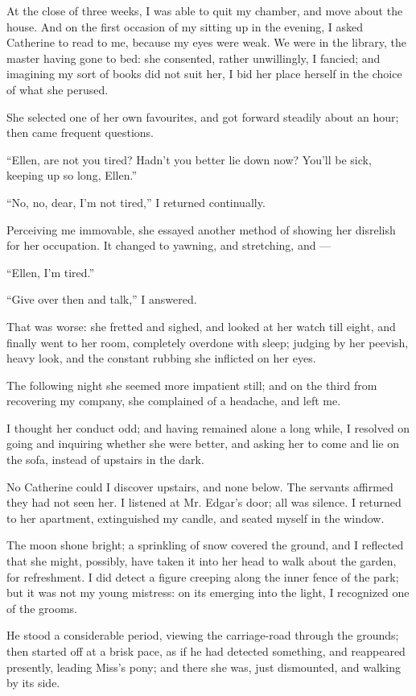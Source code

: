 \par At the close of three weeks, I was able to quit my chamber, and move about the house. And on the first occasion of my sitting up in the evening, I asked Catherine to read to me, because my eyes were weak. We were in the library, the master having gone to bed: she consented, rather unwillingly, I fancied; and imagining my sort of books did not suit her, I bid her place herself in the choice of what she perused.
\par She selected one of her own favourites, and got forward steadily about an hour; then came frequent questions.
\par “Ellen, are not you tired? Hadn't you better lie down now? You'll be sick, keeping up so long, Ellen.”
\par “No, no, dear, I'm not tired,” I returned continually.
\par Perceiving me immovable, she essayed another method of showing her disrelish for her occupation. It changed to yawning, and stretching, and —
\par “Ellen, I'm tired.”
\par “Give over then and talk,” I answered.
\par That was worse: she fretted and sighed, and looked at her watch till eight, and finally went to her room, completely overdone with sleep; judging by her peevish, heavy look, and the constant rubbing she inflicted on her eyes.
\par The following night she seemed more impatient still; and on the third from recovering my company, she complained of a headache, and left me.
\par I thought her conduct odd; and having remained alone a long while, I resolved on going and inquiring whether she were better, and asking her to come and lie on the sofa, instead of upstairs in the dark.
\par No Catherine could I discover upstairs, and none below. The servants affirmed they had not seen her. I listened at Mr. Edgar's door; all was silence. I returned to her apartment, extinguished my candle, and seated myself in the window.
\par The moon shone bright; a sprinkling of snow covered the ground, and I reflected that she might, possibly, have taken it into her head to walk about the garden, for refreshment. I did detect a figure creeping along the inner fence of the park; but it was not my young mistress: on its emerging into the light, I recognized one of the grooms.
\par He stood a considerable period, viewing the carriage-road through the grounds; then started off at a brisk pace, as if he had detected something, and reappeared presently, leading Miss's pony; and there she was, just dismounted, and walking by its side.
